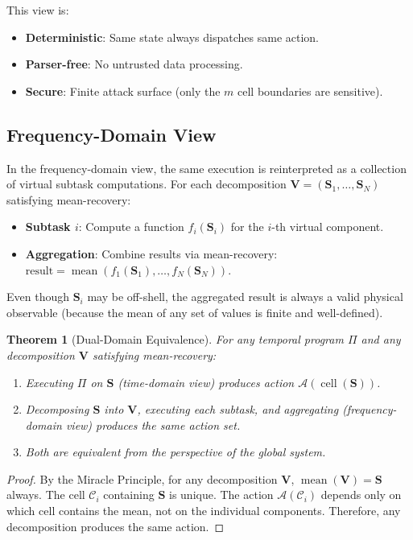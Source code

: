 \documentclass[twocolumn,11pt,a4paper]{article}
\newtheorem{theorem}{Theorem}[section]
\newcommand{\Stuple}{\mathbf{S}}
\newcommand{\calC}{\mathcal{C}}
\DeclareMathOperator{\cell}{cell}
\DeclareMathOperator{\mean}{mean}
\begin{document}
This view is:
\begin{itemize}[nosep,leftmargin=1em]
  \item \textbf{Deterministic}: Same state always dispatches same action.
  \item \textbf{Parser-free}: No untrusted data processing.
  \item \textbf{Secure}: Finite attack surface (only the $m$ cell boundaries are sensitive).
\end{itemize}

\subsection{Frequency-Domain View}

In the frequency-domain view, the same execution is reinterpreted as a collection of virtual subtask computations. For each decomposition $\mathbf{V} = (\Stuple_1, \ldots, \Stuple_N)$ satisfying mean-recovery:

\begin{itemize}[nosep,leftmargin=1em]
  \item \textbf{Subtask $i$}: Compute a function $f_i(\Stuple_i)$ for the $i$-th virtual component.
  \item \textbf{Aggregation}: Combine results via mean-recovery: $\text{result} = \mean(f_1(\Stuple_1), \ldots, f_N(\Stuple_N))$.
\end{itemize}

Even though $\Stuple_i$ may be off-shell, the aggregated result is always a valid physical observable (because the mean of any set of values is finite and well-defined).

\begin{theorem}[Dual-Domain Equivalence]
For any temporal program $\Pi$ and any decomposition $\mathbf{V}$ satisfying mean-recovery:
\begin{enumerate}[nosep,label=(\roman*)]
  \item Executing $\Pi$ on $\Stuple$ (time-domain view) produces action $\mathcal{A}(\cell(\Stuple))$.
  \item Decomposing $\Stuple$ into $\mathbf{V}$, executing each subtask, and aggregating (frequency-domain view) produces the same action set.
  \item Both are equivalent from the perspective of the global system.
\end{enumerate}
\end{theorem}

\begin{proof}
By the Miracle Principle, for any decomposition $\mathbf{V}$, $\mean(\mathbf{V}) = \Stuple$ always. The cell $\calC_i$ containing $\Stuple$ is unique. The action $\mathcal{A}(\calC_i)$ depends only on which cell contains the mean, not on the individual components. Therefore, any decomposition produces the same action.
\end{proof}
\end{document}
